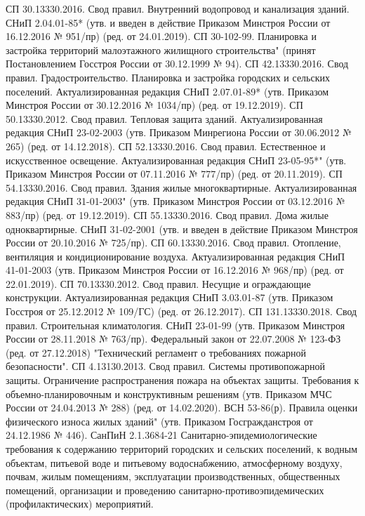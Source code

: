 \begin{thebibliography}{99}
СП 30.13330.2016. Свод правил. Внутренний водопровод и канализация зданий. СНиП 2.04.01-85* (утв. и введен в действие Приказом Минстроя России от 16.12.2016 № 951/пр) (ред. от 24.01.2019).  
СП 30-102-99. Планировка и застройка территорий малоэтажного жилищного строительства" (принят Постановлением Госстроя России от 30.12.1999 № 94).  
СП 42.13330.2016. Свод правил. Градостроительство. Планировка и застройка городских и сельских поселений. Актуализированная редакция СНиП 2.07.01-89* (утв. Приказом Минстроя России от 30.12.2016 № 1034/пр) (ред. от 19.12.2019).  
СП 50.13330.2012. Свод правил. Тепловая защита зданий. Актуализированная редакция СНиП 23-02-2003 (утв. Приказом Минрегиона России от 30.06.2012 № 265) (ред. от 14.12.2018).  
СП 52.13330.2016. Свод правил. Естественное и искусственное освещение. Актуализированная редакция СНиП 23-05-95*" (утв. Приказом Минстроя России от 07.11.2016 № 777/пр) (ред. от 20.11.2019).  
СП 54.13330.2016. Свод правил. Здания жилые многоквартирные. Актуализированная редакция СНиП 31-01-2003" (утв. Приказом Минстроя России от 03.12.2016 № 883/пр) (ред. от 19.12.2019).  
СП 55.13330.2016. Свод правил. Дома жилые одноквартирные. СНиП 31-02-2001 (утв. и введен в действие Приказом Минстроя России от 20.10.2016 № 725/пр).  
СП 60.13330.2016. Свод правил. Отопление, вентиляция и кондиционирование воздуха. Актуализированная редакция СНиП 41-01-2003 (утв. Приказом Минстроя России от 16.12.2016 № 968/пр) (ред. от 22.01.2019).  
СП 70.13330.2012. Свод правил. Несущие и ограждающие конструкции. Актуализированная редакция СНиП 3.03.01-87 (утв. Приказом Госстроя от 25.12.2012 № 109/ГС) (ред. от 26.12.2017).  
СП 131.13330.2018. Свод правил. Строительная климатология. СНиП 23-01-99 (утв. Приказом Минстроя России от 28.11.2018 № 763/пр).  
Федеральный закон от 22.07.2008 № 123-ФЗ (ред. от 27.12.2018) "Технический регламент о требованиях пожарной безопасности".  
СП 4.13130.2013. Свод правил. Системы противопожарной защиты. Ограничение распространения пожара на объектах защиты. Требования к объемно-планировочным и конструктивным решениям (утв. Приказом МЧС России от 24.04.2013 № 288) (ред. от 14.02.2020).  
ВСН 53-86(р). Правила оценки физического износа жилых зданий" (утв. Приказом Госгражданстроя от 24.12.1986 № 446).  
СанПиН 2.1.3684-21 Санитарно-эпидемиологические требования к содержанию территорий городских и сельских поселений, к водным объектам, питьевой воде и питьевому водоснабжению, атмосферному воздуху, почвам, жилым помещениям, эксплуатации производственных, общественных помещений, организации и проведению санитарно-противоэпидемических (профилактических) мероприятий.  

\end{thebibliography}
